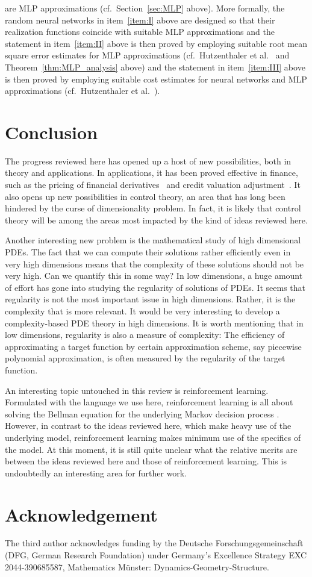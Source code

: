 \documentclass[12pt,AutoFakeBold,AutoFakeSlant]{article}
\theoremstyle{definition}
\begin{document}
	are MLP approximations 
	(cf.\ Section~\ref{sec:MLP} above). 
	More formally, 
	the random neural networks in item~\eqref{item:I} above 
	are designed so that their realization functions 
	coincide with suitable MLP approximations 
	and the statement in item~\eqref{item:II} above 
	is then proved by employing suitable root mean square error 
	estimates for MLP approximations 
	(cf.\ Hutzenthaler et al.~\cite[Theorem~3.5]{Hutzenthaleretal2018arXiv} and Theorem~\ref{thm:MLP_analysis} above)
	and the statement in item~\eqref{item:III} above 
	is then proved by employing suitable cost estimates 
	for neural networks and MLP approximations 
	(cf.\ Hutzenthaler et al.~\cite[Sections~3.2--3.3]{hutzenthaler2020proof}). 


	\section{Conclusion}
	The progress reviewed here  has opened up a host of  new possibilities, both in theory and applications.
	In applications, it has been proved effective in finance, such as the pricing of financial derivatives~\cite{wang2018deep,BeckerCheridito2019,BeckerCheriditoJentzen2019,becker2020pricing} and credit valuation adjustment~\cite{gnoatto2020deep}. 
	It also opens up new possibilities in control theory, an area that has long been hindered by the curse of dimensionality problem.
	In fact, it is likely that control theory will be among the areas most impacted by the kind of ideas reviewed here.

	Another interesting new problem is the mathematical study of high dimensional PDEs.  The fact that we can compute their solutions rather efficiently even in very high dimensions means that the complexity of these solutions should not be very high.  Can we quantify this in some way?
	In low dimensions, a  huge amount of effort has gone into studying the regularity of solutions of PDEs.  It seems that regularity is not the most important issue in high dimensions.  Rather, it is the complexity that is more relevant. It would be very interesting to develop a complexity-based PDE theory in high dimensions.  It is worth mentioning that in low dimensions, regularity is also
	a measure of complexity:  The efficiency of approximating a target function by certain approximation scheme, say piecewise polynomial approximation, is often measured by the regularity of the target function.

	An interesting topic untouched in this review is reinforcement learning.  Formulated with the language we use here, reinforcement learning is  all about solving the Bellman equation for the underlying Markov decision process \cite{sutton2018reinforcement}.
	However, in contrast to the ideas reviewed here, which make heavy use of the underlying model, reinforcement learning makes minimum use of the specifics of the model. At this moment, it is still quite unclear what the relative merits are between the ideas reviewed here and those of reinforcement learning.  This is undoubtedly an interesting area for further work.


	\section*{Acknowledgement}
	The third author acknowledges funding by the Deutsche Forschungsgemeinschaft (DFG, German Research Foundation) under Germany’s Excellence Strategy EXC 2044-390685587, Mathematics M\"{u}nster: Dynamics-Geometry-Structure.

	
	
\end{document}
